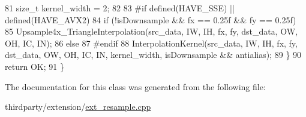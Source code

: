 \begin{DoxyCode}
81             \textcolor{keywordtype}{size\_t} kernel\_width = 2;
82 
83 \textcolor{preprocessor}{#if defined(HAVE\_SSE) || defined(HAVE\_AVX2)}
84             \textcolor{keywordflow}{if} (!isDownsample && fx == 0.25f && fy == 0.25f)
85                 Upsample4x\_TriangleInterpolation(src\_data, IW, IH, fx, fy, dst\_data, OW, OH, IC, IN);
86             \textcolor{keywordflow}{else}
87 \textcolor{preprocessor}{#endif}
88                 InterpolationKernel(src\_data, IW, IH, fx, fy, dst\_data, OW, OH, IC, IN, kernel\_width, 
      isDownsample && antialias);
89         \}
90         \textcolor{keywordflow}{return} OK;
91     \}
\end{DoxyCode}


The documentation for this class was generated from the following file\+:\begin{DoxyCompactItemize}
\item 
thirdparty/extension/\hyperlink{ext__resample_8cpp}{ext\+\_\+resample.\+cpp}\end{DoxyCompactItemize}
